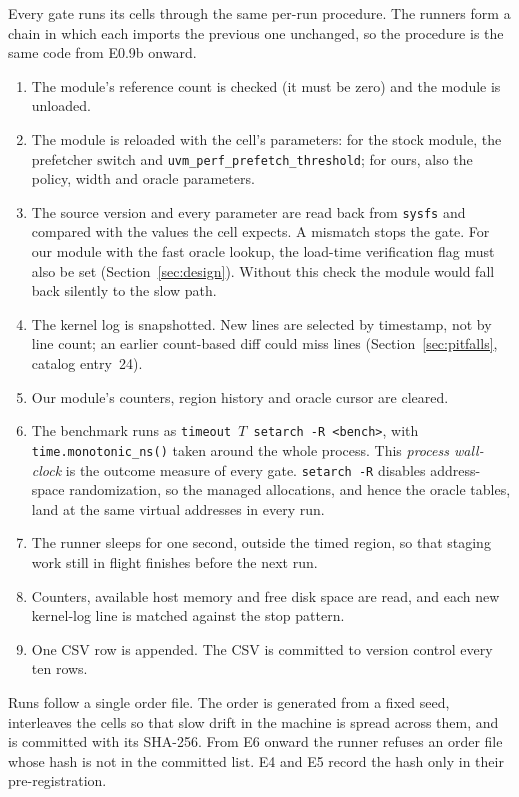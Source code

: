 Every gate runs its cells through the same per-run procedure. The
runners form a chain in which each imports the previous one unchanged,
so the procedure is the same code from E0.9b onward.
\begin{enumerate}
\item The module's reference count is checked (it must be zero) and the
  module is unloaded.
\item The module is reloaded with the cell's parameters: for the stock
  module, the prefetcher switch and \texttt{uvm\_perf\_prefetch\_threshold};
  for ours, also the policy, width and oracle parameters.
\item The source version and every parameter are read back from
  \texttt{sysfs} and compared with the values the cell expects. A
  mismatch stops the gate. For our module with the fast oracle lookup,
  the load-time verification flag must also be set
  (Section~\ref{sec:design}). Without this check the module would fall
  back silently to the slow path.
\item The kernel log is snapshotted. New lines are selected by
  timestamp, not by line count; an earlier count-based diff could miss
  lines (Section~\ref{sec:pitfalls}, catalog entry~24).
\item Our module's counters, region history and oracle cursor are
  cleared.
\item The benchmark runs as \texttt{timeout~$T$~setarch~-R~<bench>},
  with \texttt{time.monotonic\_ns()} taken around the whole process.
  This \emph{process wall-clock} is the outcome measure of every gate.
  \texttt{setarch -R} disables address-space randomization, so the
  managed allocations, and hence the oracle tables, land at the same
  virtual addresses in every run.
\item The runner sleeps for one second, outside the timed region, so
  that staging work still in flight finishes before the next run.
\item Counters, available host memory and free disk space are read, and
  each new kernel-log line is matched against the stop pattern.
\item One CSV row is appended. The CSV is committed to version control
  every ten rows.
\end{enumerate}
Runs follow a single order file. The order is generated from a fixed
seed, interleaves the cells so that slow drift in the machine is spread
across them, and is committed with its SHA-256. From E6 onward the
runner refuses an order file whose hash is not in the committed list.
E4 and E5 record the hash only in their pre-registration.

